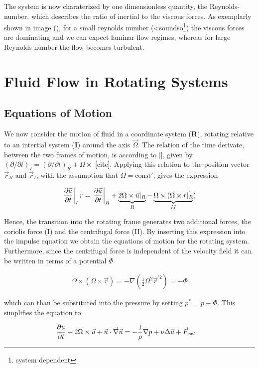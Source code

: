 {The system is now charaterized by one dimensionless quantity, the Reynolds-number, which describes the ratio of inertial to the viscous forces.
As exemplarly shown in image (),  for a small reynolds number (<soundso\footnote{system dependent})  the viscous forces are dominating and we can expect laminar flow regimes, whereas for
large Reynolds number the flow becomes turbulent.

\newpage

\section{Fluid Flow in Rotating Systems}
\subsection{Equations of Motion}

We now consider the motion of fluid in a coordinate system (\textbf{R}), rotating relative to an intertial system (\textbf{I}) around the axis $\vec{\Omega}$.
The relation of the time derivate, between the two frames of motion, is according to [], given by $(\partial/\partial t)_I = (\partial/\partial t)_R + \Omega \times $ [cite].
Applying this relation to the position vector $\vec{r}_R$ and  $\vec{r}_I$, with the assumption that $\Omega=\mathrm{const'}$, gives the expression

\begin{align}
    \left.\pdn[\vec{u}]{t}\right|_I r= \left.\pdn[\vec{u}]{t}\right|_R   + \underbrace{2\Omega \times \vec{u}|_R}_{R} - \underbrace{\Omega \times (\Omega \times \vec{r|_R}}_{II})
\end{align}

Hence, the transition into the rotating frame generates two additional forces, the coriolis force (I)  and the centrifugal force (II).
By inserting this expression into the impulse equation we obtain the equations of motion for the rotating system.
Furthermore, since the centrifugal force is independent of the velocity field it can be written in terms of a potential $\Phi$

\begin{align}
    \Omega \times (\Omega \times \vec{r}) = - \nabla(\frac{1}{2}\Omega^2\vec{r}^{'2}) = -\Phi
\end{align}

which  can than be substituted into the pressure by setting $p^* = p - \Phi$.
This simplifies the equation to

\begin{align}
    \pdn[u]{t} + 2\Omega \times \vec{u} +  \vec{u} \cdot \vec{\nabla} \vec{u} &= - \frac{1}{\rho} \nabla p + \nu \Delta \vec{u} + \vec{F}_{ext}
\end{align}

}
